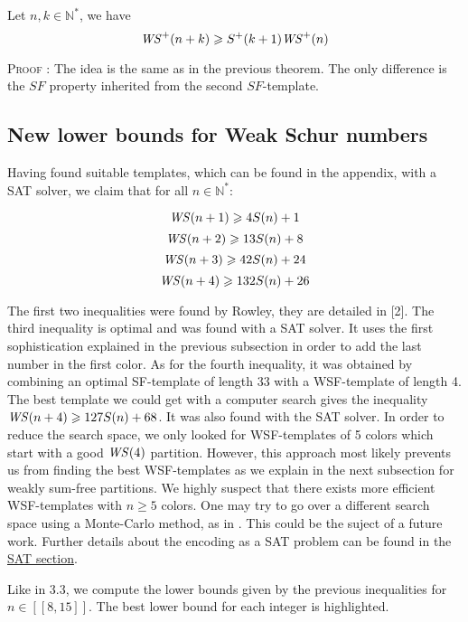 \begin{corollary}
	Let \(n, k \in \mathbb{N}^*\), we have \\
	\[ \mathit{WS}^+(n+k) \geqslant S^+(k+1) \mathit{WS}^+(n) \]
\end{corollary}

\textsc{Proof :} The idea is the same as in the previous theorem. The only difference is the \(SF\) property inherited
from the second \(SF\)-template.



\subsection{New lower bounds for Weak Schur numbers}

\qquad Having found suitable templates, which can be found in the appendix, with a SAT solver, we claim that for all \(n \in
\mathbb{N}^*\):

\[
\mathit{WS}(n+1) \geqslant 4S(n) + 1
\]
\[
\mathit{WS}(n+2) \geqslant 13S(n) + 8
\]
\[
\mathit{WS}(n+3) \geqslant 42S(n) + 24
\]
\[
\mathit{WS}(n+4) \geqslant 132S(n) + 26
\]

The first two inequalities were found by Rowley, they are detailed in [2]. The third inequality is optimal and was found with a SAT solver.
It uses the first sophistication explained in the previous subsection in order to add the last number in the first color.
As for the fourth inequality, it was obtained by combining an optimal SF-template of length 33 with a WSF-template of length 4.
The best template we could get with a computer search gives the inequality \(\mathit{WS}(n+4) \geqslant 127 S(n) + 68\).
It was also found with the SAT solver. In order to reduce the search space, we only looked for WSF-templates of
5 colors which start with a good \(\mathit{WS}(4)\) partition. However, this approach most likely prevents us from finding the best WSF-templates
as we explain in the next subsection for weakly sum-free partitions. We highly suspect that there exists more efficient WSF-templates
with \(n \geqslant 5\) colors. One may try to go over a different search space using a Monte-Carlo method, as in \cite{Bouzy2015AnAP}.
This could be the suject of a future work. Further details about the encoding as a SAT problem can be found in the
\hyperref[SAT]{SAT section}.

Like in 3.3, we compute the lower bounds given by the previous inequalities for \( n \in [\![8,15]\!] \). The best lower bound
for each integer is highlighted.

